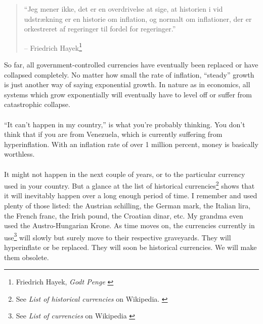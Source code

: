 \begin{quotation}\begin{samepage}
\enquote{Jeg mener ikke, det er en overdrivelse at sige, at historien i vid udstrækning er en historie om inflation, og normalt om inflationer, der er orkestreret af regeringer til fordel for regeringer.}
\begin{flushright} -- Friedrich Hayek\footnote{Friedrich Hayek, \textit{Godt Penge} \cite{hayek-good-money}}
\end{flushright}\end{samepage}\end{quotation}

\newpage

So far, all government-controlled currencies have eventually been
replaced or have collapsed completely. No matter how small the rate of
inflation, \enquote{steady} growth is just another way of saying exponential
growth. In nature as in economics, all systems which grow exponentially
will eventually have to level off or suffer from catastrophic collapse.

\paragraph{}
\enquote{It can't happen in my country,} is what you're probably thinking. You don't
think that if you are from Venezuela, which is currently suffering from
hyperinflation. With an inflation rate of over 1 million percent, money is
basically worthless. \cite{wiki:venezuela}

\paragraph{}
It might not happen in the next couple of years, or to the particular currency
used in your country. But a glance at the list of historical
currencies\footnote{See \textit{List of historical currencies} on Wikipedia.
\cite{wiki:historical-currencies}} shows that it will inevitably happen over a
long enough period of time. I remember and used plenty of those listed: the
Austrian schilling, the German mark, the Italian lira, the French franc, the
Irish pound, the Croatian dinar, etc. My grandma even used the Austro-Hungarian
Krone. As time moves on, the currencies currently in use\footnote{See
\textit{List of currencies} on Wikipedia \cite{wiki:list-of-currencies}} will
slowly but surely move to their respective graveyards. They will hyperinflate or
be replaced. They will soon be historical currencies. We will make them
obsolete.


